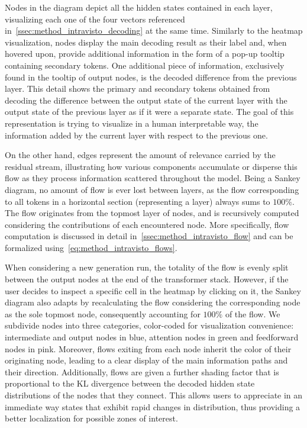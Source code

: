Nodes in the diagram depict all the hidden states contained in each layer, visualizing each one of the four vectors referenced in~\cref{ssec:method_intravisto_decoding} at the same time.
Similarly to the heatmap visualization, nodes display the main decoding result as their label and, when hovered upon, provide additional information in the form of a pop-up tooltip containing secondary tokens.
One additional piece of information, exclusively found in the tooltip of output nodes, is the decoded difference from the previous layer.
This detail shows the primary and secondary tokens obtained from decoding the difference between the output state of the current layer with the output state of the previous layer as if it were a separate state.
The goal of this representation is trying to visualize in a human interpretable way, the information added by the current layer with respect to the previous one.

On the other hand, edges represent the amount of relevance carried by the residual stream, illustrating how various components accumulate or disperse this flow as they process information scattered throughout the model.
Being a Sankey diagram, no amount of flow is ever lost between layers, as the flow corresponding to all tokens in a horizontal section (representing a layer) always sums to $100\%$.
The flow originates from the topmost layer of nodes, and is recursively computed considering the contributions of each encountered node.
More specifically, flow computation is discussed in detail in~\cref{ssec:method_intravisto_flow} and can be formalized using~\cref{eq:method_intravisto_flows}.

When considering a new generation run, the totality of the flow is evenly split between the output nodes at the end of the transformer stack.
However, if the user decides to inspect a specific cell in the heatmap by clicking on it, the Sankey diagram also adapts by recalculating the flow considering the corresponding node as the sole topmost node, consequently accounting for $100\%$ of the flow.
We subdivide nodes into three categories, color-coded for visualization convenience: intermediate and output nodes in blue, attention nodes in green and feedforward nodes in pink.
Moreover, flows exiting from each node inherit the color of their originating node, leading to a clear display of the main information paths and their direction.
Additionally, flows are given a further shading factor that is proportional to the KL divergence between the decoded hidden state distributions of the nodes that they connect.
This allows users to appreciate in an immediate way states that exhibit rapid changes in distribution, thus providing a better localization for possible zones of interest.

